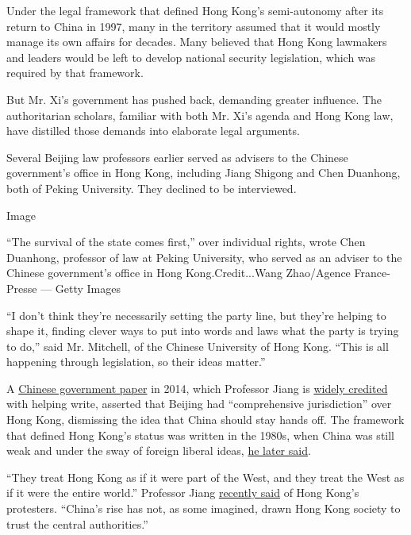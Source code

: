 Under the legal framework that defined Hong Kong's semi-autonomy after
its return to China in 1997, many in the territory assumed that it would
mostly manage its own affairs for decades. Many believed that Hong Kong
lawmakers and leaders would be left to develop national security
legislation, which was required by that framework.

But Mr. Xi's government has pushed back, demanding greater influence.
The authoritarian scholars, familiar with both Mr. Xi's agenda and Hong
Kong law, have distilled those demands into elaborate legal arguments.

Several Beijing law professors earlier served as advisers to the Chinese
government's office in Hong Kong, including Jiang Shigong and Chen
Duanhong, both of Peking University. They declined to be interviewed.

Image

``The survival of the state comes first,'' over individual rights, wrote
Chen Duanhong, professor of law at Peking University, who served as an
adviser to the Chinese government's office in Hong Kong.Credit...Wang
Zhao/Agence France-Presse --- Getty Images

``I don't think they're necessarily setting the party line, but they're
helping to shape it, finding clever ways to put into words and laws what
the party is trying to do,'' said Mr. Mitchell, of the Chinese
University of Hong Kong. ``This is all happening through legislation, so
their ideas matter.''

A
\href{http://english.www.gov.cn/archive/white_paper/2014/08/23/content_281474982986578.htm}{Chinese
government paper} in 2014, which Professor Jiang is
\href{https://tocqueville21.com/le-club/the-restructuring-of-hong-kong-and-the-rise-of-neostatism/}{widely
credited} with helping write, asserted that Beijing had ``comprehensive
jurisdiction'' over Hong Kong, dismissing the idea that China should
stay hands off. The framework that defined Hong Kong's status was
written in the 1980s, when China was still weak and under the sway of
foreign liberal ideas,
\href{https://www.dwnews.com/\%E4\%B8\%AD\%E5\%9B\%BD/59790413/\%E5\%BC\%BA\%E4\%B8\%96\%E5\%8A\%9F\%E4\%B8\%80\%E5\%9B\%BD\%E4\%B8\%A4\%E5\%88\%B6\%E4\%BA\%9F\%E9\%A1\%BB\%E8\%B5\%B0\%E5\%87\%BA\%E9\%82\%93\%E5\%B0\%8F\%E5\%B9\%B3\%E6\%97\%B6\%E4\%BB\%A3?itm_source=universal_search\&itm_campaign=universal_search\&itm_content=\%E5\%BC\%BA\%E4\%B8\%96\%E5\%8A\%9F\&itm_medium=web}{he
later said}.

``They treat Hong Kong as if it were part of the West, and they treat
the West as if it were the entire world.'' Professor Jiang
\href{http://hk.zijing.org/2020/0602/819565.shtml}{recently said} of
Hong Kong's protesters. ``China's rise has not, as some imagined, drawn
Hong Kong society to trust the central authorities.''

